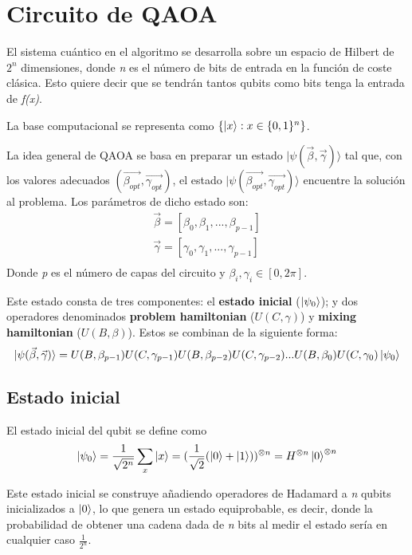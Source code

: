 \documentclass{article}
\begin{document}
\section{Circuito de QAOA}
\label{sec:3-circuito de qaoa}
El sistema cuántico en el algoritmo se desarrolla sobre un espacio de Hilbert de $2^n$ dimensiones, donde \textit{n} es el número de bits de entrada en la función de coste clásica. Esto quiere decir que se tendrán tantos qubits como bits tenga la entrada de \textit{f(x)}.

La base computacional se representa como $\{\ket{x} : x \in \{0, 1\}^n\}$.

La idea general de QAOA se basa en preparar un estado \(\lvert \psi(\vec{\beta}, \vec{\gamma})\rangle\) tal que, con los valores adecuados \( (\vec{\beta_{opt}}, \vec{\gamma_{opt}}) \), el estado \(\lvert\psi(\vec{\beta_{opt}}, \vec{\gamma_{opt}})\rangle\) encuentre la solución al problema. Los parámetros de dicho estado son:
\begin{align*}
  \vec{\beta} = [\beta_0, \beta_1, ..., \beta_{p-1}] \\
  \vec{\gamma} = [\gamma_0, \gamma_1, ..., \gamma_{p-1}] \\
\end{align*}
Donde \textit{p} es el número de capas del circuito y $\beta_i, \gamma_i \in{[0, 2\pi]}$.

Este estado consta de tres componentes: el \textbf{estado inicial} ($\ket{\psi_0}$); y dos operadores denominados \textbf{problem hamiltonian} ($U(C, \gamma)$) y \textbf{mixing hamiltonian} ($U(B, \beta)$).
Estos se combinan de la siguiente forma:
\[
  \lvert\psi(\vec{\beta}, \vec{\gamma})\rangle = U(B, \beta_{p-1})U(C, \gamma_{p-1})U(B, \beta_{p-2})U(C, \gamma_{p-2}) ... U(B, \beta_0)U(C, \gamma_0) \ket{\psi_0}
\]

\subsection{Estado inicial}
El estado inicial del qubit se define como
\begin{align*}
  \ket{\psi_0} = \frac{1}{\sqrt{2^n}} \sum_x\ket{x}
  = (\frac{1}{\sqrt{2}} (\ket{0} + \ket{1}))^{\otimes n}
  = H^{\otimes n} \ket{0}^{\otimes n}
\end{align*}

Este estado inicial se construye añadiendo operadores de Hadamard a \textit{n} qubits inicializados a $\ket{0}$, lo que genera un estado equiprobable, es decir, donde la probabilidad de obtener una cadena dada de \textit{n} bits al medir el estado sería en cualquier caso $\frac{1}{2^n}$.
\end{document}
